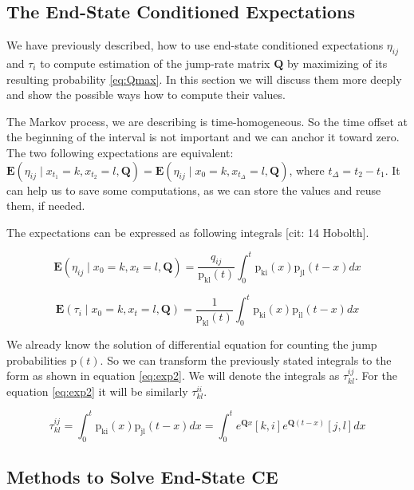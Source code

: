\documentclass[thesis=M,english]{FITthesis}[2012/10/20]
\newcommand{\matr}[1]{\mathbf{#1}}
\begin{document}
\subsection{The End-State Conditioned Expectations}\label{sec:endexp}

We have previously described, how to use end-state conditioned expectations $\eta_{ij}$ and $\tau_i$ to compute estimation of the jump-rate matrix $\matr{Q}$ by maximizing of its resulting probability \eqref{eq:Qmax}. In this section we will discuss them more deeply and show the possible ways how to compute their values.

The Markov process, we are describing is time-homogeneous. So the time offset at the beginning of the interval is not important and we can anchor it toward zero. The two following expectations are equivalent: $\mathbf{E}(\eta_{ij} \mid x_{t_1} = k, x_{t_2} = l, \matr{ Q } ) = \mathbf{E}(\eta_{ij} \mid x_0 = k, x_{t_\Delta} = l, \matr{ Q } )$, where ${t_\Delta} = {t_2} - {t_1}$. It can help us to save some computations, as we can store the values and reuse them, if needed.

The expectations can be expressed as following integrals [cit: 14 Hobolth].   

\begin{equation}\label{eq:exp1}
\mathbf{E}(\eta_{ij} \mid x_0 = k, x_t = l, \matr{ Q } ) = \frac{ q_{ij} }{ \mathrm{p_{kl}}(t) } 
\int_{0}^{t} \mathrm{p_{ki}}(x) \mathrm{p_{jl}}(t-x) dx
\end{equation}

\begin{equation}\label{eq:exp2}
\mathbf{E}( \tau_i \mid x_0 = k, x_t = l, \matr{ Q } ) = \frac{ 1 }{ \mathrm{p_{kl}}(t) } 
\int_{0}^{t} \mathrm{p_{ki}}(x) \mathrm{p_{il}}(t-x) dx
\end{equation}

We already know the solution of differential equation for counting the jump probabilities $\mathrm{p}(t)$. So we can transform the previously stated integrals to the form as shown in equation \eqref{eq:exp2}. We will denote the integrals as $\tau^{ij}_{kl}$. For the equation \eqref{eq:exp2} it will be similarly $\tau^{ii}_{kl}$. 

\begin{equation}\label{eq:int}
\tau^{ij}_{kl} = \int_{0}^{t} \mathrm{p_{ki}}(x) \mathrm{p_{jl}}(t-x) dx = 
\int_{0}^{t} {e^{\matr{Q}x}}[k,i] {e^{\matr{Q}(t-x)}}[j,l] dx
\end{equation} 

\subsection{Methods to Solve End-State CE }\label{sec:solve}
\end{document}
